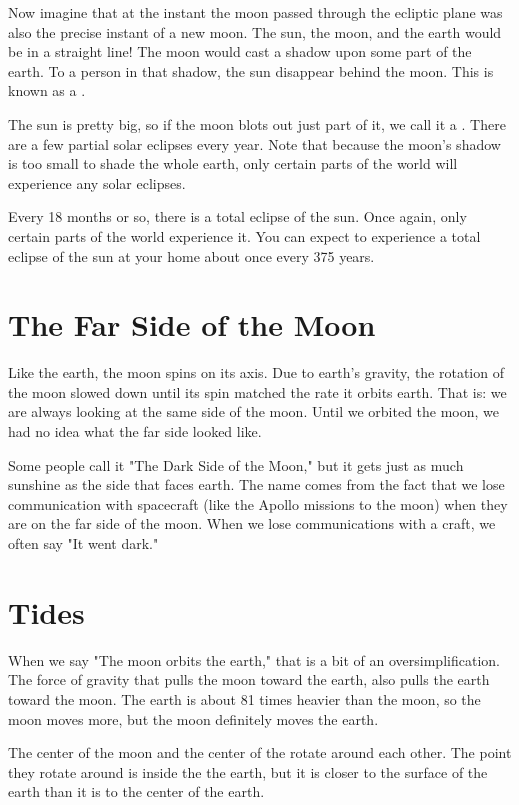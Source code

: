 Now imagine that at the instant the moon passed through the ecliptic plane was also the precise instant of a new moon.    The sun,  the moon, and the earth would be in a straight line!  The moon would cast a shadow upon some part of the earth.  To a person in that shadow,  the sun disappear behind the moon.   This is known as a .

The sun is pretty big,  so if the moon blots out just part of it,  we call it a .  There are a few partial solar eclipses every year.   Note that because the moon's shadow is too small to shade the whole earth,   only certain parts of the world will experience any solar eclipses. 

Every 18 months or so,  there is a total eclipse of the sun.  Once again,  only certain parts of the world experience it.   You can expect to experience a total eclipse of the sun at your home about once every 375 years.
 
\section{The Far Side of the Moon}

Like the earth,  the moon spins on its axis.  Due to earth's gravity,  the rotation of the moon slowed down until its spin matched the rate it orbits earth.  That is: we are always looking at the same side of the moon.  Until we orbited the moon,  we had no idea what the far side looked like.

Some people call it "The Dark Side of the Moon," but it gets just as much sunshine as the side that faces earth.  The name comes from the fact that we lose communication with spacecraft (like the Apollo missions to the moon) when they are on the far side of the moon.  When we lose communications with a craft, 
we often say "It went dark."

\section{Tides}

When we say "The moon orbits the earth,"  that is a bit of an oversimplification.  The force of gravity that pulls the moon toward the earth,  also pulls the earth toward the moon.   The earth is about 81 times heavier
than the moon,  so the moon moves more, but the moon definitely moves the earth.

The center of the moon and the center of the rotate around each other.  The point they rotate around is inside the the earth,  but it is closer to the surface of the earth than it is to the center of the earth.

